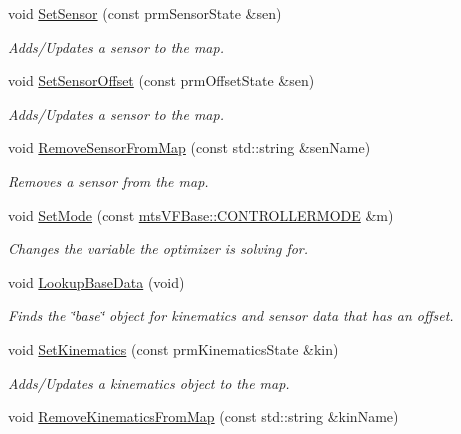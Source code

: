 \begin{DoxyCompactItemize}
void \hyperlink{classmts_v_f_controller_a4bc9686480a583054ca0615a4bbc8b46}{Set\+Sensor} (const prm\+Sensor\+State \&sen)
\begin{DoxyCompactList}\small\item\em Adds/\+Updates a sensor to the map. \end{DoxyCompactList}\item 
void \hyperlink{classmts_v_f_controller_a7da3be1c2a5cd3e2f94fa13adecbdffc}{Set\+Sensor\+Offset} (const prm\+Offset\+State \&sen)
\begin{DoxyCompactList}\small\item\em Adds/\+Updates a sensor to the map. \end{DoxyCompactList}\item 
void \hyperlink{classmts_v_f_controller_a3c00912ec4d7055cc61bd6cf61b51c2c}{Remove\+Sensor\+From\+Map} (const std\+::string \&sen\+Name)
\begin{DoxyCompactList}\small\item\em Removes a sensor from the map. \end{DoxyCompactList}\item 
void \hyperlink{classmts_v_f_controller_a9b2a191244f649c4648a1f3e555ceaae}{Set\+Mode} (const \hyperlink{classmts_v_f_base_a742dd08f8b70bafeb746cec14d9ee974}{mts\+V\+F\+Base\+::\+C\+O\+N\+T\+R\+O\+L\+L\+E\+R\+M\+O\+D\+E} \&m)
\begin{DoxyCompactList}\small\item\em Changes the variable the optimizer is solving for. \end{DoxyCompactList}\item 
void \hyperlink{classmts_v_f_controller_a84f09db2d388d29d5224a30bdb68d76f}{Lookup\+Base\+Data} (void)
\begin{DoxyCompactList}\small\item\em Finds the \char`\"{}base\char`\"{} object for kinematics and sensor data that has an offset. \end{DoxyCompactList}\item 
void \hyperlink{classmts_v_f_controller_af32d53c8bc0cdb3db21c9887cd759c7a}{Set\+Kinematics} (const prm\+Kinematics\+State \&kin)
\begin{DoxyCompactList}\small\item\em Adds/\+Updates a kinematics object to the map. \end{DoxyCompactList}\item 
void \hyperlink{classmts_v_f_controller_a742a86f34faf0b1416939bf21ddf366b}{Remove\+Kinematics\+From\+Map} (const std\+::string \&kin\+Name)

\end{DoxyCompactItemize}
